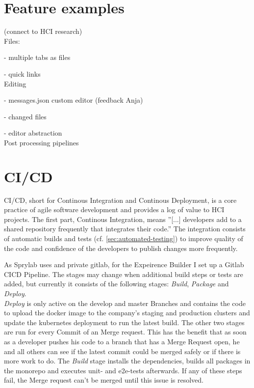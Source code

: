 \section{Feature examples}

(connect to HCI research)
\\
Files:

- multiple tabs as files

- quick links
\\
Editing

- messages.json custom editor (feedback Anja)

- changed files

- editor abstraction
\\
Post processing pipelines


\section{CI/CD}

CI/CD, short for Continous Integration and Continous Deployment, is a core practice of agile software development and provides a log of value to
HCI projects. The first part, Continous Integration, means ''[...] developers add to a shared repository frequently that integrates their code.'' \cite[p. 81]{LearnHCI:2020ys}
The integration consists of automatic builds and tests (cf. \ref*{sec:automated-testing}) to improve quality of the code and confidence of the developers to publish changes more frequently.

As Sprylab uses and private gitlab, for the Expeirence Builder I set up a Gitlab CICD Pipeline. The stages may change when additional build steps or tests are added, but currently it consists of the following stages: \textit{Build}, \textit{Package} and \textit{Deploy}.
\\
\textit{Deploy} is only active on the develop and master Branches and contains the code to upload the docker image to the company's staging and production clusters and update the kubernetes deployment to run the latest build.
The other two stages are run for every Commit of an Merge request. This has the benefit that as soon as a developer pushes his code to a branch that has a Merge Request open,
he and all others can see if the latest commit could be merged safely or if there is more work to do.
The \textit{Build} stage installs the dependencies, builds all packages in the monorepo and executes unit- and e2e-tests afterwards. If any of these steps fail, the Merge request can't be merged until this issue is resolved.

